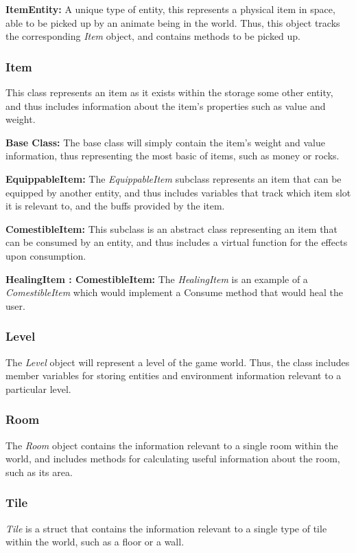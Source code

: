 \documentclass{article}
\begin{document}
\textbf{ItemEntity:} A unique type of entity, this represents a physical item in space, able to be picked up by an animate being in the world. Thus, this object tracks the corresponding \textit{Item} object, and contains methods to be picked up.
\subsubsection{Item}
This class represents an item as it exists within the storage some other entity, and thus includes information about the item's properties such as value and weight.

\textbf{Base Class:} The base class will simply contain the item's weight and value information, thus representing the most basic of items, such as money or rocks.

\textbf{EquippableItem:} The \textit{EquippableItem} subclass represents an item that can be equipped by another entity, and thus includes variables that track which item slot it is relevant to, and the buffs provided by the item.

\textbf{ComestibleItem:} This subclass is an abstract class representing an item that can be consumed by an entity, and thus includes a virtual function for the effects upon consumption.

\textbf{HealingItem : ComestibleItem:} The \textit{HealingItem} is an example of a \textit{ComestibleItem} which would implement a Consume method that would heal the user.
\subsubsection{Level}
The \textit{Level} object will represent a level of the game world. Thus, the class includes member variables for storing entities and environment information relevant to a particular level.
\subsubsection{Room}
The \textit{Room} object contains the information relevant to a single room within the world, and includes methods for calculating useful information about the room, such as its area.
\subsubsection{Tile}
\textit{Tile} is a struct that contains the information relevant to a single type of tile within the world, such as a floor or a wall.
\end{document}

